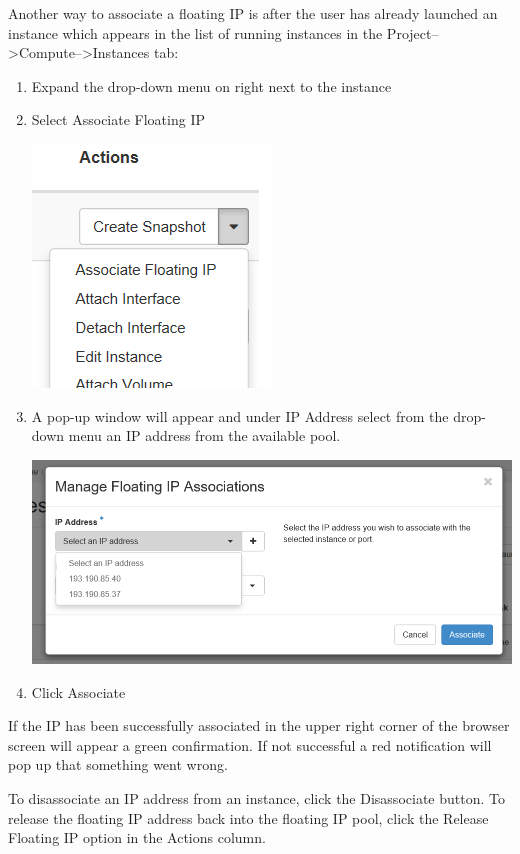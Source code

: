 Another way to associate a floating IP is after the user has already launched an instance which appears in the list of running instances in the Project-->Compute-->Instances tab:

\begin{enumerate}
\item Expand the drop-down menu on right next to the instance
\item Select Associate Floating IP
\begin{center}
\includegraphics[scale=0.7]{img/associate_IP_1.png}
\end{center}
\item A pop-up window will appear and under IP Address select from the
  drop-down menu an IP address from the available pool.
\begin{center}
\includegraphics[scale=0.5]{img/associate_IP_2.png}
\end{center}
\item Click Associate
\end{enumerate}

If the IP has been successfully associated in the upper right corner of the browser screen will appear a green confirmation. If not successful a red notification will pop up that something went wrong.

 To disassociate an IP address from an instance, click
the Disassociate button.  To release the floating IP address back into
the floating IP pool, click the Release Floating IP option in the
Actions column.


